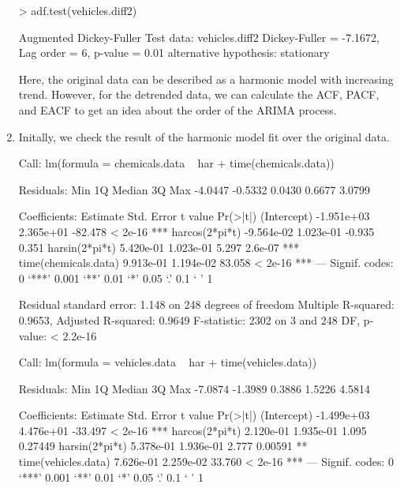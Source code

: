 \begin{enumerate}[label=(\roman*)]
\begin{block}
> adf.test(vehicles.diff2)

Augmented Dickey-Fuller Test
data:  vehicles.diff2
Dickey-Fuller = -7.1672, Lag order = 6, p-value = 0.01
alternative hypothesis: stationary
\end{block}
\normalsize Here, the original data can be described as a harmonic model with increasing trend. However, for the detrended data, we can calculate the ACF, PACF, and EACF to get an idea about the order of the ARIMA process.  
\item Initally, we check the result of the harmonic model fit over the original data. \small\begin{block}
Call:
lm(formula = chemicals.data ~ har + time(chemicals.data))

Residuals:
    Min      1Q  Median      3Q     Max 
-4.0447 -0.5332  0.0430  0.6677  3.0799 

Coefficients:
                       Estimate Std. Error t value Pr(>|t|)    
(Intercept)          -1.951e+03  2.365e+01 -82.478  < 2e-16 ***
harcos(2*pi*t)       -9.564e-02  1.023e-01  -0.935    0.351    
harsin(2*pi*t)        5.420e-01  1.023e-01   5.297  2.6e-07 ***
time(chemicals.data)  9.913e-01  1.194e-02  83.058  < 2e-16 ***
---
Signif. codes:  0 ‘***’ 0.001 ‘**’ 0.01 ‘*’ 0.05 ‘.’ 0.1 ‘ ’ 1

Residual standard error: 1.148 on 248 degrees of freedom
Multiple R-squared:  0.9653,	Adjusted R-squared:  0.9649 
F-statistic:  2302 on 3 and 248 DF,  p-value: < 2.2e-16

Call:
lm(formula = vehicles.data ~ har + time(vehicles.data))

Residuals:
    Min      1Q  Median      3Q     Max 
-7.0874 -1.3989  0.3886  1.5226  4.5814 

Coefficients:
                      Estimate Std. Error t value Pr(>|t|)    
(Intercept)         -1.499e+03  4.476e+01 -33.497  < 2e-16 ***
harcos(2*pi*t)       2.120e-01  1.935e-01   1.095  0.27449    
harsin(2*pi*t)       5.378e-01  1.936e-01   2.777  0.00591 ** 
time(vehicles.data)  7.626e-01  2.259e-02  33.760  < 2e-16 ***
---
Signif. codes:  0 ‘***’ 0.001 ‘**’ 0.01 ‘*’ 0.05 ‘.’ 0.1 ‘ ’ 1


\end{block}
\end{enumerate}
